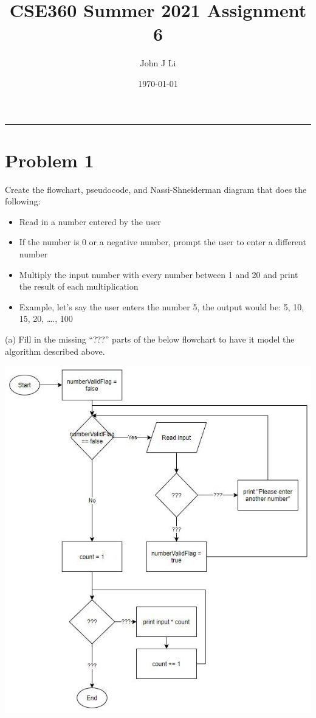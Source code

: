 \documentclass{article}
\title{CSE360 Summer 2021 Assignment 6}
\date{\today}
\author{John J Li}
\begin{document}
    \maketitle
    \thispagestyle{empty}
    \noindent\rule{\textwidth}{0.8pt}

    \section*{Problem 1}

    Create the flowchart, pseudocode, and Nassi-Shneiderman diagram that does the
    following:
    \begin{itemize}
        \item 
        Read in a number entered by the user
        \item
        If the number is 0 or a negative number, prompt the user to enter a different
        number
        \item
        Multiply the input number with every number between 1 and 20 and print the
        result of each multiplication
        \item
        Example, let’s say the user enters the number 5, the output would be: 5, 10, 15,
        20, …., 100
    \end{itemize}

    (a) Fill in the missing “???” parts of the below flowchart to have it model the
    algorithm described above.

    \begin{center}
        \includegraphics[scale=0.9]{Exercise 6_ Practice Problem 1.jpg}
    \end{center}
\end{document}
